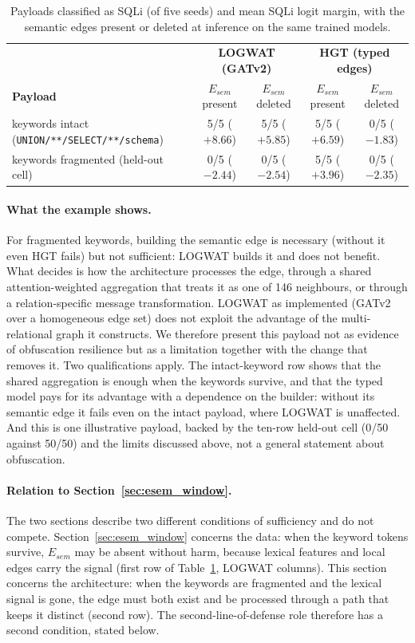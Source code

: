 \begin{table}[t]
\centering
\caption{Payloads classified as SQLi (of five seeds) and mean SQLi logit margin, with the semantic edges present or deleted at inference on the same trained models.}
\label{tab:case_study}
\footnotesize
\begin{tabular}{|l|c|c|c|c|}
\hline
 & \multicolumn{2}{c|}{\textbf{LOGWAT (GATv2)}} & \multicolumn{2}{c|}{\textbf{HGT (typed edges)}} \\
\textbf{Payload} & $E_{sem}$ present & $E_{sem}$ deleted & $E_{sem}$ present & $E_{sem}$ deleted \\
\hline
keywords intact (\texttt{UNION/**/SELECT/**/schema}) & 5/5 ($+8.66$) & 5/5 ($+5.85$) & 5/5 ($+6.59$) & 0/5 ($-1.83$) \\
keywords fragmented (held-out cell)                   & 0/5 ($-2.44$) & 0/5 ($-2.54$) & 5/5 ($+3.96$) & 0/5 ($-2.35$) \\
\hline
\end{tabular}
\end{table}

\paragraph{What the example shows.}
For fragmented keywords, building the semantic edge is necessary (without it even HGT fails) but not sufficient: LOGWAT builds it and does not benefit. What decides is how the architecture processes the edge, through a shared attention-weighted aggregation that treats it as one of 146 neighbours, or through a relation-specific message transformation. LOGWAT as implemented (GATv2 over a homogeneous edge set) does not exploit the advantage of the multi-relational graph it constructs. We therefore present this payload not as evidence of obfuscation resilience but as a limitation together with the change that removes it. Two qualifications apply. The intact-keyword row shows that the shared aggregation is enough when the keywords survive, and that the typed model pays for its advantage with a dependence on the builder: without its semantic edge it fails even on the intact payload, where LOGWAT is unaffected. And this is one illustrative payload, backed by the ten-row held-out cell (0/50 against 50/50) and the limits discussed above, not a general statement about obfuscation.

\paragraph{Relation to Section~\ref{sec:esem_window}.}
The two sections describe two different conditions of sufficiency and do not compete. Section~\ref{sec:esem_window} concerns the data: when the keyword tokens survive, $E_{sem}$ may be absent without harm, because lexical features and local edges carry the signal (first row of Table~\ref{tab:case_study}, LOGWAT columns). This section concerns the architecture: when the keywords are fragmented and the lexical signal is gone, the edge must both exist and be processed through a path that keeps it distinct (second row). The second-line-of-defense role therefore has a second condition, stated below.

